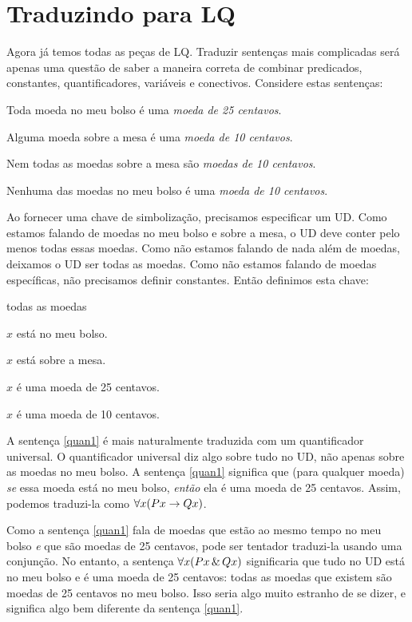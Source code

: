 \section{Traduzindo para LQ}
Agora já temos todas as peças de LQ. Traduzir sentenças mais complicadas será apenas uma questão de saber a maneira correta de combinar predicados, constantes, quantificadores, variáveis e conectivos. Considere estas sentenças:
\begin{earg}
\item[\ex{quan1}] Toda moeda no meu bolso é uma \emph{moeda de 25 centavos}.
\item[\ex{quan2}] Alguma moeda sobre a mesa é uma \emph{moeda de 10 centavos}.
\item[\ex{quan3}] Nem todas as moedas sobre a mesa são \emph{moedas de 10 centavos}.
\item[\ex{quan4}] Nenhuma das moedas no meu bolso é uma \emph{moeda de 10 centavos}.
\end{earg}
Ao fornecer uma chave de simbolização, precisamos especificar um UD. Como estamos falando de moedas no meu bolso e sobre a mesa, o UD deve conter pelo menos todas essas moedas. Como não estamos falando de nada além de moedas, deixamos o UD ser todas as moedas. Como não estamos falando de moedas específicas, não precisamos definir constantes. Então definimos esta chave:
\begin{ekey}
\item[UD:] todas as moedas
\item[Px:] $x$ está no meu bolso.
\item[Tx:] $x$ está sobre a mesa.
\item[Qx:] $x$ é uma moeda de 25 centavos.
\item[Dx:] $x$ é uma moeda de 10 centavos.
\end{ekey}
A sentença \ref{quan1} é mais naturalmente traduzida com um quantificador universal. O quantificador universal diz algo sobre tudo no UD, não apenas sobre as moedas no meu bolso. A sentença \ref{quan1} significa que (para qualquer moeda) \emph{se} essa moeda está no meu bolso, \emph{então} ela é uma moeda de 25 centavos. Assim, podemos traduzi-la como $\forall x(Px \rightarrow Qx)$.

Como a sentença \ref{quan1} fala de moedas que estão ao mesmo tempo no meu bolso \emph{e} que são moedas de 25 centavos, pode ser tentador traduzi-la usando uma conjunção. No entanto, a sentença $\forall x(Px \,\&\, Qx)$ significaria que tudo no UD está no meu bolso e é uma moeda de 25 centavos: todas as moedas que existem são moedas de 25 centavos no meu bolso. Isso seria algo muito estranho de se dizer, e significa algo bem diferente da sentença \ref{quan1}.

